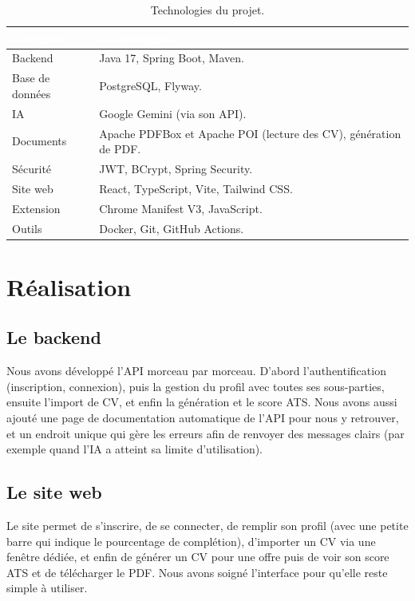 \documentclass[12pt,a4paper]{report}
\newcommand{\THead}[1]{\textcolor{white}{\textbf{#1}}}
\newcommand{\rowhead}{\rowcolor{navyblue}}
\begin{document}
\begin{table}[h]
\centering\small
\begin{tabularx}{\linewidth}{L{3.4cm}X}
\toprule
\rowhead \THead{Cat\'egorie} & \THead{Technologies} \\
\midrule
{} Backend & Java 17, Spring Boot, Maven. \\
Base de donn\'ees & PostgreSQL, Flyway. \\
 IA & Google Gemini (via son API). \\
Documents & Apache PDFBox et Apache POI (lecture des CV), g\'en\'eration de PDF. \\
 S\'ecurit\'e & JWT, BCrypt, Spring Security. \\
Site web & React, TypeScript, Vite, Tailwind CSS. \\
 Extension & Chrome Manifest V3, JavaScript. \\
Outils & Docker, Git, GitHub Actions. \\
\bottomrule
\end{tabularx}
\caption{Technologies du projet.}
\label{tab:techno}
\end{table}

\chapter{R\'ealisation}

\section{Le backend}
Nous avons d\'evelopp\'e l'API morceau par morceau. D'abord l'authentification
(inscription, connexion), puis la gestion du profil avec toutes ses
sous-parties, ensuite l'import de CV, et enfin la g\'en\'eration et le score ATS.
Nous avons aussi ajout\'e une page de documentation automatique de l'API pour
nous y retrouver, et un endroit unique qui g\`ere les erreurs afin de renvoyer des
messages clairs (par exemple quand l'IA a atteint sa limite d'utilisation).

\section{Le site web}
Le site permet de s'inscrire, de se connecter, de remplir son profil (avec une
petite barre qui indique le pourcentage de compl\'etion), d'importer un CV via une
fen\^etre d\'edi\'ee, et enfin de g\'en\'erer un CV pour une offre puis de voir son score
ATS et de t\'el\'echarger le PDF. Nous avons soign\'e l'interface pour qu'elle reste
simple \`a utiliser.
\end{document}
